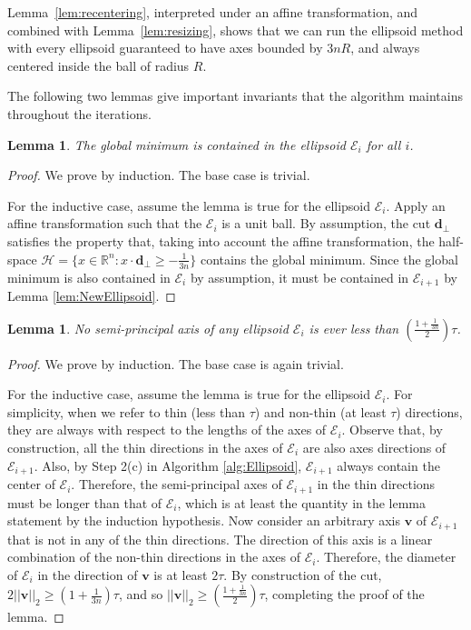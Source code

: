 \documentclass[11pt,letter]{article}
\renewcommand{\vec}[1]{\mathbf{#1}}
\newcommand{\Real}{\mathbb{R}}
\newcounter{nTheorems}
\numberwithin{nTheorems}{section}
\newtheorem{lemma}[nTheorems]{Lemma}
\begin{document}
Lemma~\ref{lem:recentering}, interpreted under an affine transformation, and combined with Lemma~\ref{lem:resizing}, shows that we can run the ellipsoid method with every ellipsoid guaranteed to have axes bounded by $3nR$, and always centered inside the ball of radius $R$.





The following two lemmas give important invariants that the algorithm maintains throughout the iterations.

\begin{lemma}
The global minimum is contained in the ellipsoid $\mathcal{E}_i$ for all $i$.
\end{lemma}

\begin{proof}
We prove by induction.
The base case is trivial.

For the inductive case, assume the lemma is true for the ellipsoid $\mathcal{E}_i$.
Apply an affine transformation such that the $\mathcal{E}_i$ is a unit ball.
By assumption, the cut $\vec{d}_\bot$ satisfies the property that, taking into account the affine transformation, the half-space $\mathcal{H} = \{x \in \Real^n : x\cdot\hat{\vec{d}}_\bot \ge -\frac{1}{3n}\}$ contains the global minimum.
Since the global minimum is also contained in $\mathcal{E}_i$ by assumption, it must be contained in $\mathcal{E}_{i+1}$ by Lemma \ref{lem:NewEllipsoid}.
\end{proof}

\begin{lemma}
\label{lem:AxesLB}
No semi-principal axis of any ellipsoid $\mathcal{E}_i$ is ever less than $\left(\frac{1+\frac{1}{3n}}{2}\right)\tau$.
\end{lemma}

\begin{proof}
We prove by induction.
The base case is again trivial.

For the inductive case, assume the lemma is true for the ellipsoid $\mathcal{E}_i$.
For simplicity, when we refer to thin (less than $\tau$) and non-thin (at least $\tau$) directions, they are always with respect to the lengths of the axes of $\mathcal{E}_i$.
Observe that, by construction, all the thin directions in the axes of $\mathcal{E}_i$ are also axes directions of $\mathcal{E}_{i+1}$.
Also, by Step 2(c) in Algorithm \ref{alg:Ellipsoid}, $\mathcal{E}_{i+1}$ always contain the center of $\mathcal{E}_i$.
Therefore, the semi-principal axes of $\mathcal{E}_{i+1}$ in the thin directions must be longer than that of $\mathcal{E}_i$, which is at least the quantity in the lemma statement by the induction hypothesis.
Now consider an arbitrary axis $\vec{v}$ of $\mathcal{E}_{i+1}$ that is not in any of the thin directions.
The direction of this axis is a linear combination of the non-thin directions in the axes of $\mathcal{E}_i$.
Therefore, the diameter of $\mathcal{E}_i$ in the direction of $\vec{v}$ is at least $2\tau$.
By construction of the cut, $2||\vec{v}||_2 \ge (1+\frac{1}{3n})\tau$, and so
$||\vec{v}||_2 \ge \left(\frac{1+\frac{1}{3n}}{2}\right)\tau$,
completing the proof of the lemma.
\end{proof}
\end{document}
